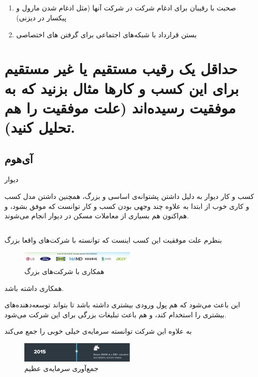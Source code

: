\documentclass[dvipsnames, svgnames, x11names, 11pt, twocolumn]{article}
\begin{document}
\subsection{}
\begin{enumerate}
\item 
صحبت با رقیبان برای ادغام شرکت در شرکت آنها (مثل ادغام شدن مارول و پیکسار در دیزنی)

\item 
بستن قرارداد با شبکه‌های اجتماعی برای گرفتن 
های 
اختصاصی 
\end{enumerate}

\section{حداقل یک رقیب مستقیم یا غیر مستقیم برای این کسب و کارها مثال بزنید که به موفقیت رسیده‌اند (علت موفقیت را هم تحلیل کنید).}
\subsection{آی‌هوم}
دیوار

کسب و کار دیوار به دلیل داشتن پشتوانه‌ی اساسی و بزرگ، همچنین داشتن مدل کسب و کاری خوب از ابتدا به علاوه چند وجهی بودن کسب و کار توانست که موفق بشود، و هم‌اکنون هم بسیاری از معاملات مسکن در دیوار انجام می‌شوند.

\subsection{}

بنظرم علت موفقیت این کسب اینست که توانسته با شرکت‌های واقعا بزرگ 
\begin{figure}[H]
\begin{center}
\includegraphics[width=0.5\textwidth, height=0.05\textheight]{images/argyle-big}
\caption{همکاری با شرکت‌های بزرگ}
\end{center}
\end{figure}
همکاری داشته باشد.

این باعث می‌شود که هم پول ورودی بیشتری داشته باشد تا بتواند توسعه‌دهنده‌های بیشتری را استخدام کند، و هم باعث تبلیغات بزرگی برای این شرکت می‌شود.

به علاوه این شرکت توانسته سرمایه‌ی خیلی خوبی را جمع می‌کند
\begin{figure}[H]
\begin{center}
\includegraphics[width=0.5\textwidth, height=0.05\textheight]{images/sp-fund}
\caption{جمع‌آوری سرمایه‌ی عظیم}
\end{center}
\end{figure}
\end{document}
